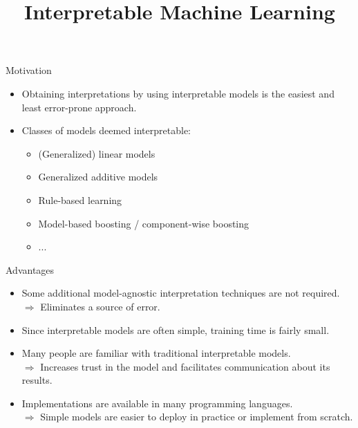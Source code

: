 \documentclass[11pt,compress,t,notes=noshow, aspectratio=169, xcolor=table]{beamer}
\title{Interpretable Machine Learning}
\date{}
\begin{document}
\newcommand{\titlefigure}{figure/whitebox}
\newcommand{\learninggoals}{
\item What characteristics does an interpretable model have?
\item Why should we use interpretable models at all?
\item Examples for interpretable models.}


\begin{frame}{Motivation}

    \begin{itemize}
        \item Obtaining interpretations by using interpretable models is the easiest and least error-prone approach.
        \bigskip
        \item Classes of models deemed interpretable:
        \begin{itemize}
            \item (Generalized) linear models
            \item Generalized additive models
            \item Rule-based learning
            \item Model-based boosting / component-wise boosting
            \item ...
        \end{itemize}
    \end{itemize}

\end{frame}

\begin{frame}{Advantages}

    \begin{itemize}
    \itemsep1em
        \item Some additional model-agnostic interpretation techniques are not required.\\
        $\Rightarrow$ Eliminates a source of error.
        \item Since interpretable models are often simple, training time is fairly small.
        \item Many people are familiar with traditional interpretable models.\\
        $\Rightarrow$ Increases trust in the model and facilitates communication about its results.
        \item Implementations are available in many programming languages. \\
        $\Rightarrow$ Simple models are easier to deploy in practice or implement from scratch.
    \end{itemize}

\end{frame}
\end{document}
